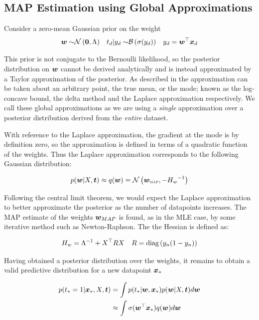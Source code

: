 \subsection*{MAP Estimation using Global Approximations}
\newcommand \wmap[0] { \vv{w}_{\text{\tiny \sc MAP}} }

Consider a zero-mean Gaussian prior on the weight
\begin{align}\bm w \sim & \mathcal{N} \left( {\bm 0}, {\Lambda} \right) &
t_d | y_d \sim & \mathcal{B}\left( \sigma(y_d) \right) & 
y_d = \bm w^\top\bm x_d  \label{eqn:bayes-logit-model}
\end{align}

This prior is not conjugate to the Bernoulli likelihood, so the posterior distribution on $\bm w$ cannot be derived analytically and is instead approximated by a Taylor approximation of the posterior. As described in \cite{Wang2013} the approximation can be taken about an arbitrary point, the true mean, or the mode; known as the log-concave bound, the delta method and the Laplace approximation respectively. We call these global approximations as we are using a \emph{single} approximation over a posterior distribution derived from the \emph{entire} dataset.

With reference to the Laplace approximation, the gradient at the mode is by definition zero, so the approximation is defined in terms of a quadratic function of the weights. Thus the Laplace approximation corresponds to the following Gaussian distribution:

\begin{equation}
p(\vv{w}|X,\vv{t}) \approx q(\vv{w}) = \nor{\wmap}{-\inv{H_w}}
\end{equation}

Following the central limit theorem, we would expect the Laplace approximation to better approximate the posterior as the number of datapoints increases. The MAP estimate of the weights $\bm w_{MAP}$ is found, as in the MLE case, by some iterative method such as Newton-Raphson. The the Hessian is defined as:

\begin{align}
H_w   & = {\Lambda}^{-1} + X^\top R X & R = \text{diag} \left( {y_n(1 - y_n)} \right) 
\end{align}

Having obtained a posterior distribution over the weights, it remains to obtain a valid predictive distribution for a new datapoint $\bm x_*$

\begin{align}
p(t_* = 1| \bm x_*, X, \bm t) & = \int p(t_*|\bm w, \bm x_*)p(\bm w|X,\bm t) d\bm w \label{eqn:log-reg-predict} \\
 & \approx \int \sigma(\bm w^\top\bm x_*)q(\bm w) d\bm w \label{eqn:log-reg-predict-approx-q}
\end{align}

